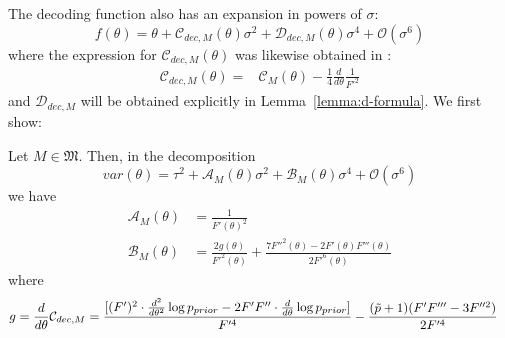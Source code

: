 The decoding function also has an expansion in powers of $\sigma$:
\begin{equation}\label{eq:expansion-f}
f(\theta) = \theta + \mathcal{C}_{dec,M}(\theta) \sigma^2 + \mathcal{D}_{dec,M}(\theta) \sigma^4 + \mathcal{O}(\sigma^6)    
\end{equation}
where the expression for $\mathcal{C}_{dec,M}(\theta)$ was likewise obtained in \cite{hahn2024unifying}:
\begin{align*}
    \mathcal{C}_{dec,M}(\theta)  =  & \mathcal{C}_{M}(\theta) - \frac{1}{4} \frac{d}{d\theta} \frac{1}{F'^2} 
\end{align*}
and $\mathcal{D}_{dec,M}$ will be obtained explicitly in Lemma~\ref{lemma:d-formula}.
We first show:
\begin{lemma}\label{lemma:calculation-for-b}
Let $M \in \mathfrak{M}$. Then, in the decomposition
\begin{equation}
var(\theta) = \tau^2 + \mathcal{A}_M(\theta) \sigma^2 + \mathcal{B}_M(\theta) \sigma^4 + \mathcal{O}(\sigma^6) 
\end{equation}
we have
\begin{align*}
    \mathcal{A}_M(\theta) &= \frac{1}{F'(\theta)^2} \\
    \mathcal{B}_M(\theta) &= \frac{2g(\theta)}{F'^2(\theta)} + \frac{7F''^2(\theta) - 2F'(\theta)F'''(\theta)}{2F'^6(\theta)}
\end{align*}
        where
        \begin{align*}
        g &= \frac{d}{d\theta} \mathcal{C}_{dec,M} = \frac{[(F')^2 \cdot \frac{d^2}{d \theta^2}\log p_{prior} - 2F'F'' \cdot \frac{d}{d \theta}\log p_{prior}]}{F'^4} - \frac{(\tilde{p}+1)(F'F''' - 3F''^2)}{2F'^4}
\end{align*}

\end{lemma}

